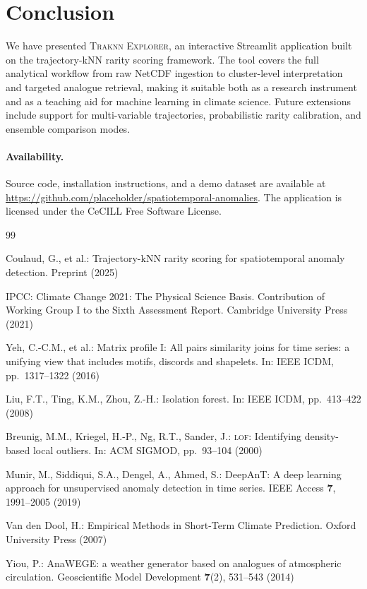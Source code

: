 \documentclass[runningheads]{llncs}
\begin{document}
\section{Conclusion}
\label{sec:conclusion}

We have presented \textsc{Traknn Explorer}, an interactive Streamlit
application built on the trajectory-kNN rarity scoring framework.
The tool covers the full analytical workflow from raw NetCDF ingestion to
cluster-level interpretation and targeted analogue retrieval, making it
suitable both as a research instrument and as a teaching aid for machine
learning in climate science.
Future extensions include support for multi-variable trajectories,
probabilistic rarity calibration, and ensemble comparison modes.

\paragraph{Availability.}
Source code, installation instructions, and a demo dataset are available at
\url{https://github.com/placeholder/spatiotemporal-anomalies}.
The application is licensed under the CeCILL Free Software License.

\begin{thebibliography}{99}

Coulaud, G., et al.:
Trajectory-kNN rarity scoring for spatiotemporal anomaly detection.
Preprint (2025)

IPCC:
Climate Change 2021: The Physical Science Basis. Contribution of Working
Group I to the Sixth Assessment Report.
Cambridge University Press (2021)

Yeh, C.-C.M., et al.:
Matrix profile I: All pairs similarity joins for time series: a unifying view
that includes motifs, discords and shapelets.
In: IEEE ICDM, pp.~1317--1322 (2016)

Liu, F.T., Ting, K.M., Zhou, Z.-H.:
Isolation forest.
In: IEEE ICDM, pp.~413--422 (2008)

Breunig, M.M., Kriegel, H.-P., Ng, R.T., Sander, J.:
\textsc{lof}: Identifying density-based local outliers.
In: ACM SIGMOD, pp.~93--104 (2000)

Munir, M., Siddiqui, S.A., Dengel, A., Ahmed, S.:
DeepAnT: A deep learning approach for unsupervised anomaly detection in time
series.
IEEE Access \textbf{7}, 1991--2005 (2019)

Van den Dool, H.:
Empirical Methods in Short-Term Climate Prediction.
Oxford University Press (2007)

Yiou, P.:
AnaWEGE: a weather generator based on analogues of atmospheric circulation.
Geoscientific Model Development \textbf{7}(2), 531--543 (2014)

\end{thebibliography}
\end{document}
